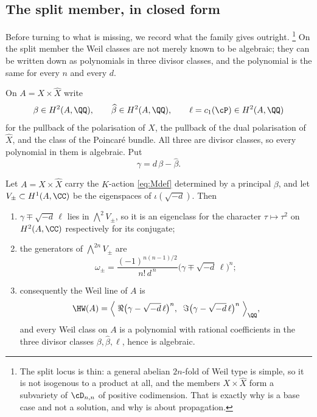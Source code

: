 \subsection{The split member, in closed form}\label{ssec:split}

Before turning to what is missing, we record what the family gives outright.%
\footnote{The split locus is thin: a general abelian $2n$-fold of Weil type is simple, so it is not isogenous to a product at all, and the members $X\times\widehat{X}$ form a subvariety of $\cD_{n,n}$ of positive codimension. That is exactly why  is a base case and not a solution, and why  is about propagation.}
On the split member the Weil classes are not merely known to be algebraic;
they can be written down as polynomials in three divisor classes, and the
polynomial is the same for every $n$ and every $d$.

\begin{notation}\label{not:threeclasses}
On $A=X\times\widehat{X}$ write
\[
  \beta\in H^{2}(A,\QQ),
  \qquad
  \widehat{\beta}\in H^{2}(A,\QQ),
  \qquad
  \ell=c_{1}(\cP)\in H^{2}(A,\QQ)
\]
for the pullback of the polarisation of $X$, the pullback of the dual
polarisation of $\widehat{X}$, and the class of the Poincar\'e bundle. All
three are divisor classes, so every polynomial in them is algebraic. Put
\begin{equation}\label{eq:gammadef}
  \gamma=d\,\beta-\widehat{\beta}.
\end{equation}
\end{notation}

\begin{theorem}\label{thm:splitclosed}
Let $A=X\times\widehat{X}$ carry the $K$-action \eqref{eq:Mdef} determined by a
principal $\beta$, and let $V_{\pm}\subset H^{1}(A,\CC)$ be the eigenspaces of
$\iota(\sqrt{-d})$. Then
\begin{enumerate}[label=\textup{(\roman*)},nosep]
\item $\gamma\mp\sqrt{-d}\,\ell$ lies in $\bigwedge^{2}V_{\pm}$, so it is an
  eigenclass for the character $\tau\mapsto\tau^{2}$ on $H^{2}(A,\CC)$
  respectively for its conjugate;
\item the generators of $\bigwedge^{2n}V_{\pm}$ are
  \begin{equation}\label{eq:splitclosed}
    \omega_{\pm}
    =\frac{(-1)^{n(n-1)/2}}{n!\,d^{\,n}}
      \bigl(\gamma\mp\sqrt{-d}\,\ell\bigr)^{n};
  \end{equation}
\item consequently the Weil line of $A$ is
  \[
    \HW(A)=\Bigl\langle\;
      \Re\bigl(\gamma-\sqrt{-d}\,\ell\bigr)^{n},\;\;
      \Im\bigl(\gamma-\sqrt{-d}\,\ell\bigr)^{n}
    \;\Bigr\rangle_{\QQ},
  \]
  and every Weil class on $A$ is a polynomial with rational coefficients in
  the three divisor classes $\beta,\widehat{\beta},\ell$, hence is algebraic.
\end{enumerate}
\end{theorem}

